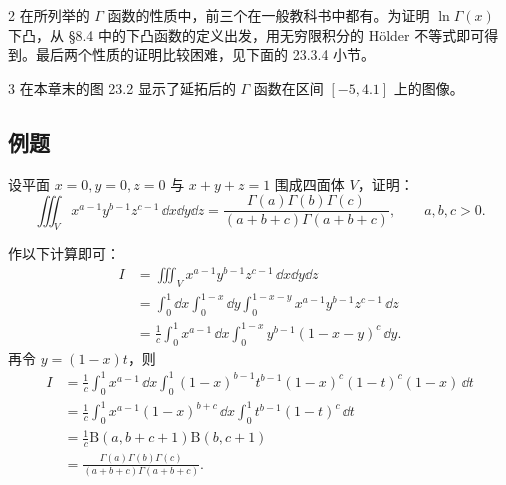 \begin{xremark}
2 在所列举的 $\Gamma$ 函数的性质中，前三个在一般教科书中都有。为证明 $\ln\Gamma(x)$ 下凸，从 §8.4 中的下凸函数的定义出发，用无穷限积分的 Hölder 不等式即可得到。最后两个性质的证明比较困难，见下面的 23.3.4 小节。
\end{xremark}

\begin{xremark}
3 在本章末的图 23.2 显示了延拓后的 $\Gamma$ 函数在区间 $[-5,4.1]$ 上的图像。
\end{xremark}

\subsection{例题}

\begin{xexample}[23.3.1]
设平面 $x=0,y=0,z=0$ 与 $x+y+z=1$ 围成四面体 $V$，证明：
\[
  \iiint_V x^{a-1}y^{b-1}z^{c-1}\,\dd x\dd y\dd z
  =\frac{\Gamma(a)\Gamma(b)\Gamma(c)}{(a+b+c)\Gamma(a+b+c)},\qquad a,b,c>0.
\]
\end{xexample}
\begin{xproof}
作以下计算即可：
\[
\begin{aligned}
  I&=\iiint_V x^{a-1}y^{b-1}z^{c-1}\,\dd x\dd y\dd z\\
  &=\int_0^1\dd x\int_0^{1-x}\dd y\int_0^{1-x-y}x^{a-1}y^{b-1}z^{c-1}\,\dd z\\
  &=\frac1c\int_0^1x^{a-1}\,\dd x\int_0^{1-x}y^{b-1}(1-x-y)^c\,\dd y.
\end{aligned}
\]
再令 $y=(1-x)t$，则
\[
\begin{aligned}
  I&=\frac1c\int_0^1x^{a-1}\,\dd x\int_0^1(1-x)^{b-1}t^{b-1}(1-x)^c(1-t)^c(1-x)\,\dd t\\
  &=\frac1c\int_0^1x^{a-1}(1-x)^{b+c}\,\dd x\int_0^1t^{b-1}(1-t)^c\,\dd t\\
  &=\frac1c\mathrm{B}(a,b+c+1)\mathrm{B}(b,c+1)\\
  &=\frac{\Gamma(a)\Gamma(b)\Gamma(c)}{(a+b+c)\Gamma(a+b+c)}.
\end{aligned}
\]
\end{xproof}


